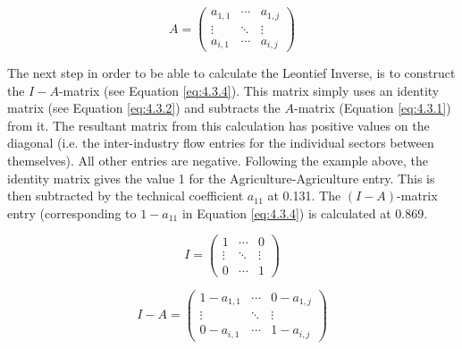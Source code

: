 \begin{doublespacing}
  \bigskip
\begin{singlespacing}
 \begin{equation} \label{eq:4.3.1}
  A = \begin{pmatrix}
  a_{1,1} & \cdots & a_{1,j} \\
  \vdots & \ddots & \vdots  \\
  a_{i,1} & \cdots & a_{i,j}
  \end{pmatrix} \end{equation} 
  \end{singlespacing} \bigskip

The next step in order to be able to calculate the Leontief Inverse, is to construct the $I-\textit{A}$-matrix (see Equation \ref{eq:4.3.4}). This matrix simply uses an identity matrix (see Equation \ref{eq:4.3.2}) and subtracts the $\textit{A}$-matrix (Equation \ref{eq:4.3.1}) from it. The resultant matrix from this calculation has positive values on the diagonal (i.e. the inter-industry flow entries for the individual sectors between themselves). All other entries are negative. Following the example above, the identity matrix gives the value 1 for the Agriculture-Agriculture entry. This is then subtracted by the technical coefficient $a_{11}$  at 0.131. The $(I-A)$-matrix entry (corresponding to $1-a_{11}$ in Equation \ref{eq:4.3.4}) is calculated at 0.869.

  \bigskip \begin{singlespacing} \begin{equation} \label{eq:4.3.2}
  I = \begin{pmatrix}
    1 & \cdots & 0 \\
    \vdots & \ddots & \vdots  \\
    0 & \cdots & 1
  \end{pmatrix} \end{equation} \end{singlespacing} 

  \begin{singlespacing} \begin{equation} \label{eq:4.3.3}
  I-A = \begin{pmatrix}
  1-a_{1,1} & \cdots & 0-a_{1,j} \\
  \vdots & \ddots & \vdots  \\
  0-a_{i,1} & \cdots & 1-a_{i,j}
   \end{pmatrix}   \end{equation} \end{singlespacing}  \bigskip


\end{doublespacing}
